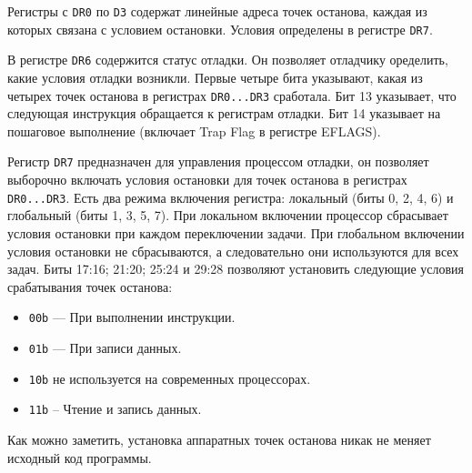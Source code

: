 Регистры с \verb!DR0! по \verb!D3! содержат линейные адреса точек останова,
каждая из которых связана с условием остановки. Условия определены в регистре
\verb!DR7!.

В регистре \verb!DR6! содержится статус отладки. Он позволяет отладчику
оределить, какие условия отладки возникли. Первые четыре бита указывают, какая
из четырех точек останова в регистрах \verb!DR0...DR3! сработала. Бит 13
указывает, что следующая инструкция обращается к регистрам отладки. Бит 14
указывает на пошаговое выполнение (включает Trap Flag в регистре EFLAGS). 

Регистр \verb!DR7! предназначен для управления процессом отладки, он позволяет
выборочно включать условия остановки для точек останова в регистрах
\verb!DR0...DR3!. Есть два режима включения регистра: локальный (биты 0, 2, 4,
6) и глобальный (биты 1, 3, 5, 7). При локальном включении процессор сбрасывает
условия остановки при каждом переключении задачи. При глобальном включении
условия остановки не сбрасываются, а следовательно они используются для всех
задач. Биты 17:16; 21:20; 25:24 и 29:28 позволяют установить следующие условия
срабатывания точек останова:
\begin{itemize}
  \item \verb!00b! --- При выполнении инструкции.
  \item \verb!01b! --- При записи данных.
  \item \verb!10b! не используется на современных процессорах.
  \item \verb!11b! -- Чтение и запись данных.
\end{itemize}

Как можно заметить, установка аппаратных точек останова никак не меняет исходный
код программы.
